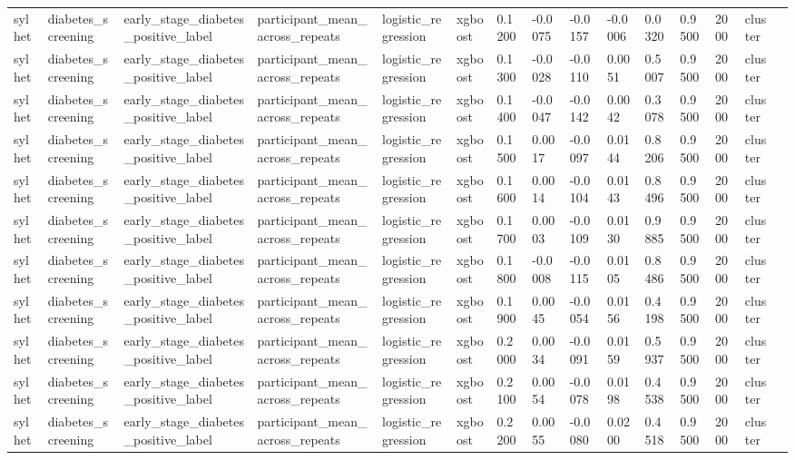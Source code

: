 \begin{tabular}{lllllllllllllll}
sylhet & diabetes\_screening & early\_stage\_diabetes\_positive\_label & participant\_mean\_across\_repeats & logistic\_regression & xgboost & 0.1200 & -0.0075 & -0.0157 & -0.0006 & 0.0320 & 0.9500 & 2000 & cluster &  \\
sylhet & diabetes\_screening & early\_stage\_diabetes\_positive\_label & participant\_mean\_across\_repeats & logistic\_regression & xgboost & 0.1300 & -0.0028 & -0.0110 & 0.0051 & 0.5007 & 0.9500 & 2000 & cluster &  \\
sylhet & diabetes\_screening & early\_stage\_diabetes\_positive\_label & participant\_mean\_across\_repeats & logistic\_regression & xgboost & 0.1400 & -0.0047 & -0.0142 & 0.0042 & 0.3078 & 0.9500 & 2000 & cluster &  \\
sylhet & diabetes\_screening & early\_stage\_diabetes\_positive\_label & participant\_mean\_across\_repeats & logistic\_regression & xgboost & 0.1500 & 0.0017 & -0.0097 & 0.0144 & 0.8206 & 0.9500 & 2000 & cluster &  \\
sylhet & diabetes\_screening & early\_stage\_diabetes\_positive\_label & participant\_mean\_across\_repeats & logistic\_regression & xgboost & 0.1600 & 0.0014 & -0.0104 & 0.0143 & 0.8496 & 0.9500 & 2000 & cluster &  \\
sylhet & diabetes\_screening & early\_stage\_diabetes\_positive\_label & participant\_mean\_across\_repeats & logistic\_regression & xgboost & 0.1700 & 0.0003 & -0.0109 & 0.0130 & 0.9885 & 0.9500 & 2000 & cluster &  \\
sylhet & diabetes\_screening & early\_stage\_diabetes\_positive\_label & participant\_mean\_across\_repeats & logistic\_regression & xgboost & 0.1800 & -0.0008 & -0.0115 & 0.0105 & 0.8486 & 0.9500 & 2000 & cluster &  \\
sylhet & diabetes\_screening & early\_stage\_diabetes\_positive\_label & participant\_mean\_across\_repeats & logistic\_regression & xgboost & 0.1900 & 0.0045 & -0.0054 & 0.0156 & 0.4198 & 0.9500 & 2000 & cluster &  \\
sylhet & diabetes\_screening & early\_stage\_diabetes\_positive\_label & participant\_mean\_across\_repeats & logistic\_regression & xgboost & 0.2000 & 0.0034 & -0.0091 & 0.0159 & 0.5937 & 0.9500 & 2000 & cluster &  \\
sylhet & diabetes\_screening & early\_stage\_diabetes\_positive\_label & participant\_mean\_across\_repeats & logistic\_regression & xgboost & 0.2100 & 0.0054 & -0.0078 & 0.0198 & 0.4538 & 0.9500 & 2000 & cluster &  \\
sylhet & diabetes\_screening & early\_stage\_diabetes\_positive\_label & participant\_mean\_across\_repeats & logistic\_regression & xgboost & 0.2200 & 0.0055 & -0.0080 & 0.0200 & 0.4518 & 0.9500 & 2000 & cluster &  \\

\end{tabular}
